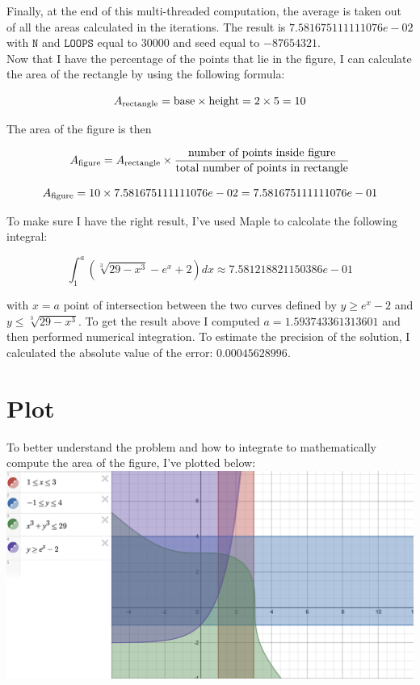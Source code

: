 \documentclass{article}
\newcommand{\code}{\texttt}
\begin{document}
Finally, at the end of this multi-threaded computation, the average is taken out of all the areas calculated in the iterations. The result is $7.581675111111076e-02$ with $\code{N}$ and $\code{LOOPS}$ equal to 30000 and seed equal to $-87654321$.\\

Now that I have the percentage of the points that lie in the figure, I can calculate the area of the rectangle by using the following formula: 

$$A_{\textnormal{rectangle}}= \textnormal{base}\times \textnormal{height}=2\times5=10$$

The area of the figure is then

$$A_{\textnormal{figure}}=A_{\textnormal{rectangle}}\times \frac{\textnormal{number of points inside figure}}{\textnormal{total number of points in rectangle}}$$

$$A_{\textnormal{figure}}=10\times 7.581675111111076e-02=7.581675111111076e-01$$

To make sure I have the right result, I've used Maple to calcolate the following integral:

$$
\int_1^{a} (\sqrt[3]{29-x^3}-e^x+2)dx\approx 7.581218821150386e-01
$$

with $x=a$ point of intersection between the two curves defined by $y\ge e^x-2$ and $y\le \sqrt[3]{29-x^3}$. To get the result above I computed $a=1.593743361313601$ and then performed numerical integration. To estimate the precision of the solution, I calculated the absolute value of the error: $0.00045628996$.

\section{Plot}
To better understand the problem and how to integrate to mathematically compute the area of the figure, I've plotted below:\\

\includegraphics[width=\textwidth,height=\textheight,keepaspectratio]{desmos.png}
\end{document}
